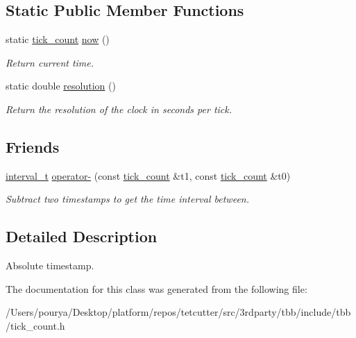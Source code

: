 \subsection*{Static Public Member Functions}
\begin{DoxyCompactItemize}
\item 
\hypertarget{classtbb_1_1tick__count_a74dcecde7431ff4591d7c46fc1d50d7e}{}static \hyperlink{classtbb_1_1tick__count}{tick\+\_\+count} \hyperlink{classtbb_1_1tick__count_a74dcecde7431ff4591d7c46fc1d50d7e}{now} ()\label{classtbb_1_1tick__count_a74dcecde7431ff4591d7c46fc1d50d7e}

\begin{DoxyCompactList}\small\item\em Return current time. \end{DoxyCompactList}\item 
\hypertarget{classtbb_1_1tick__count_aaf6a0d91e7d40f7d68e0ad6b79350e58}{}static double \hyperlink{classtbb_1_1tick__count_aaf6a0d91e7d40f7d68e0ad6b79350e58}{resolution} ()\label{classtbb_1_1tick__count_aaf6a0d91e7d40f7d68e0ad6b79350e58}

\begin{DoxyCompactList}\small\item\em Return the resolution of the clock in seconds per tick. \end{DoxyCompactList}\end{DoxyCompactItemize}
\subsection*{Friends}
\begin{DoxyCompactItemize}
\item 
\hypertarget{classtbb_1_1tick__count_ab5ceaed3ebf5a0d41088a5bc7c8dc653}{}\hyperlink{classtbb_1_1tick__count_1_1interval__t}{interval\+\_\+t} \hyperlink{classtbb_1_1tick__count_ab5ceaed3ebf5a0d41088a5bc7c8dc653}{operator-\/} (const \hyperlink{classtbb_1_1tick__count}{tick\+\_\+count} \&t1, const \hyperlink{classtbb_1_1tick__count}{tick\+\_\+count} \&t0)\label{classtbb_1_1tick__count_ab5ceaed3ebf5a0d41088a5bc7c8dc653}

\begin{DoxyCompactList}\small\item\em Subtract two timestamps to get the time interval between. \end{DoxyCompactList}\end{DoxyCompactItemize}


\subsection{Detailed Description}
Absolute timestamp. 



The documentation for this class was generated from the following file\+:\begin{DoxyCompactItemize}
\item 
/\+Users/pourya/\+Desktop/platform/repos/tetcutter/src/3rdparty/tbb/include/tbb/tick\+\_\+count.\+h\end{DoxyCompactItemize}
